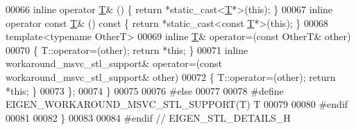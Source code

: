 \begin{DoxyCode}
00066     \textcolor{keyword}{inline} \textcolor{keyword}{operator} \hyperlink{group___sparse_core___module_class_eigen_1_1_triplet}{T}& () \{ \textcolor{keywordflow}{return} *\textcolor{keyword}{static\_cast<}\hyperlink{group___sparse_core___module_class_eigen_1_1_triplet}{T}*\textcolor{keyword}{>}(\textcolor{keyword}{this}); \}
00067     \textcolor{keyword}{inline} \textcolor{keyword}{operator} \textcolor{keyword}{const} \hyperlink{group___sparse_core___module_class_eigen_1_1_triplet}{T}& () \textcolor{keyword}{const} \{ \textcolor{keywordflow}{return} *\textcolor{keyword}{static\_cast<}\textcolor{keyword}{const }\hyperlink{group___sparse_core___module_class_eigen_1_1_triplet}{T}*\textcolor{keyword}{>}(\textcolor{keyword}{this}); \}
00068     \textcolor{keyword}{template}<\textcolor{keyword}{typename} OtherT>
00069     \textcolor{keyword}{inline} \hyperlink{group___sparse_core___module_class_eigen_1_1_triplet}{T}& operator=(\textcolor{keyword}{const} OtherT& other)
00070     \{ T::operator=(other); \textcolor{keywordflow}{return} *\textcolor{keyword}{this}; \}
00071     \textcolor{keyword}{inline} workaround\_msvc\_stl\_support& operator=(\textcolor{keyword}{const} workaround\_msvc\_stl\_support& other)
00072     \{ T::operator=(other); \textcolor{keywordflow}{return} *\textcolor{keyword}{this}; \}
00073   \};
00074   \}
00075 
00076 \textcolor{preprocessor}{#else}
00077 
00078 \textcolor{preprocessor}{#define EIGEN\_WORKAROUND\_MSVC\_STL\_SUPPORT(T) T}
00079 
00080 \textcolor{preprocessor}{#endif}
00081 
00082 \}
00083 
00084 \textcolor{preprocessor}{#endif // EIGEN\_STL\_DETAILS\_H}
\end{DoxyCode}
